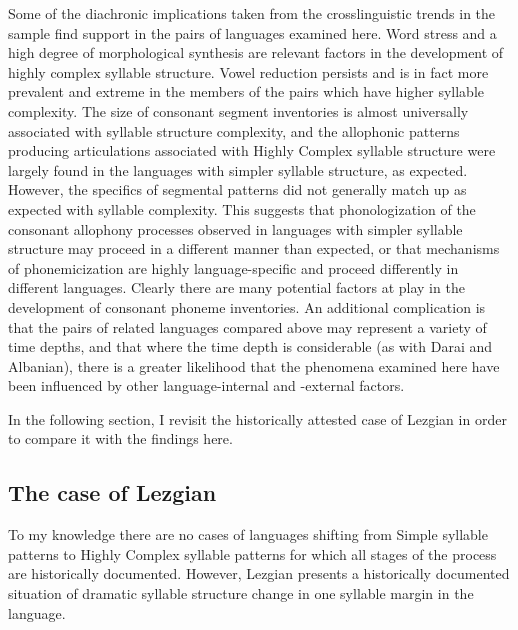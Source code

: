   Some of the diachronic implications taken from the crosslinguistic trends in the sample find support in the pairs of languages examined here. Word stress and a high degree of morphological synthesis are relevant factors in the development of highly complex syllable structure. Vowel reduction persists and is in fact more prevalent and extreme in the members of the pairs which have higher syllable complexity. The size of consonant segment inventories is almost universally associated with syllable structure complexity, and the allophonic patterns producing articulations associated with Highly Complex syllable structure were largely found in the languages with simpler syllable structure, as expected. However, the specifics of segmental patterns did not generally match up as expected with syllable complexity. This suggests that phonologization of the consonant allophony processes observed in languages with simpler syllable structure may proceed in a different manner than expected, or that mechanisms of phonemicization are highly language-specific and proceed differently in different languages. Clearly there are many potential factors at play in the development of consonant phoneme inventories. An additional complication is that the pairs of related languages compared above may represent a variety of time depths, and that where the time depth is considerable (as with Darai and Albanian), there is a greater likelihood that the phenomena examined here have been influenced by other language-internal and -external factors.

  In the following section, I revisit the historically attested case of Lezgian in order to compare it with the findings here.

\subsection{The case of Lezgian}\label{sec:8.4.4}

  To my knowledge there are no cases of languages shifting from Simple syllable patterns to Highly Complex syllable patterns for which all stages of the process are historically documented. However, Lezgian presents a historically documented situation of dramatic syllable structure change in one syllable margin in the language.

